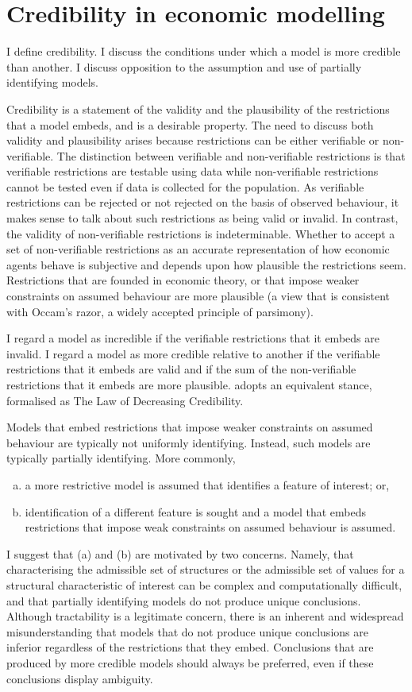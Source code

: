 \documentclass[12pt,a4paper,twoside]{article}
\numberwithin{equation}{section}
\begin{document}
\section{Credibility in economic modelling}
I define credibility. I discuss the conditions under which a model is more credible than another. I discuss opposition to the assumption and use of partially identifying models.

Credibility is a statement of the validity and the plausibility of the restrictions that a model embeds, and is a desirable property. The need to discuss both validity and plausibility arises because restrictions can be either verifiable or non-verifiable. The distinction between verifiable and non-verifiable restrictions is that verifiable restrictions are testable using data while non-verifiable restrictions cannot be tested even if data is collected for the population. As verifiable restrictions can be rejected or not rejected on the basis of observed behaviour, it makes sense to talk about such restrictions as being valid or invalid. In contrast, the validity of non-verifiable restrictions is indeterminable. Whether to accept a set of non-verifiable restrictions as an accurate representation of how economic agents behave is subjective and depends upon how plausible the restrictions seem. Restrictions that are founded in economic theory, or that impose weaker constraints on assumed behaviour are more plausible (a view that is consistent with Occam's razor, a widely accepted principle of parsimony).      

I regard a model as incredible if the verifiable restrictions that it embeds are invalid. I regard a model as more credible relative to another if the verifiable restrictions that it embeds are valid and if the sum of the non-verifiable restrictions that it embeds are more plausible. \cite{book.manski} adopts an equivalent stance, formalised as The Law of Decreasing Credibility. 

Models that embed restrictions that impose weaker constraints on assumed behaviour are typically not uniformly identifying. Instead, such models are typically partially identifying. More commonly, 
\begin{enumerate}[(a)]
\item a more restrictive model is assumed that identifies a feature of interest; or,
\item identification of a different feature is sought and a model that embeds restrictions that impose weak constraints on assumed behaviour is assumed.
\end{enumerate}
I suggest that (a) and (b) are motivated by two concerns. Namely, that characterising the admissible set of structures or the admissible set of values for a structural characteristic of interest can be complex and computationally difficult, and that partially identifying models do not produce unique conclusions. Although tractability is a legitimate concern, there is an inherent and widespread misunderstanding that models that do not produce unique conclusions are inferior regardless of the restrictions that they embed. Conclusions that are produced by more credible models should always be preferred, even if these conclusions display ambiguity. 
\end{document}
